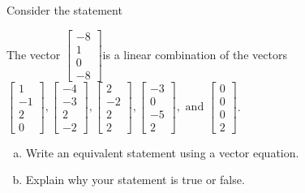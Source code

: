 
\begin{exerciseStatement}


Consider the statement 
\begin{center}\begin{minipage}{0.8\textwidth}
 The vector \( \left[\begin{array}{c}
-8 \\
1 \\
0 \\
-8
\end{array}\right] \)is a linear combination of the vectors \( \left[\begin{array}{c}
1 \\
-1 \\
2 \\
0
\end{array}\right] , \left[\begin{array}{c}
-4 \\
-3 \\
2 \\
-2
\end{array}\right] , \left[\begin{array}{c}
2 \\
-2 \\
2 \\
2
\end{array}\right] , \left[\begin{array}{c}
-3 \\
0 \\
-5 \\
2
\end{array}\right] , \text{ and } \left[\begin{array}{c}
0 \\
0 \\
0 \\
2
\end{array}\right] \). 
\end{minipage}\end{center}
    


\begin{enumerate}[(a)]
\item  Write an equivalent statement using a vector equation.
\item  Explain why your statement is true or false.
\end{enumerate}
    
\end{exerciseStatement}
    
